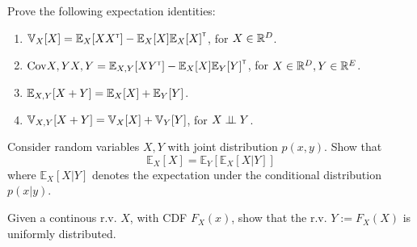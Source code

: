 \begin{question}
Prove the following expectation identities:
\begin{enumerate}[label=\alph*.]
\item $\Var{X}{X} = \Exp{X}{XX\transpose} - \Exp{X}{X}\Exp{X}{X}\transpose$, for $X \in \mathbb{R}^D$.
\item $\Cov{X,Y}{X,Y} = \Exp{X,Y}{XY\transpose} - \Exp{X}{X}\Exp{Y}{Y}\transpose$, for $X \in \mathbb{R}^D, Y\in\mathbb{R}^E$.
\item $\Exp{X,Y}{X + Y} = \Exp{X}{X} + \Exp{Y}{Y}$.
\item $\Var{X,Y}{X + Y} = \Var{X}{X} + \Var{Y}{Y}$, for $X \perp\!\!\!\perp Y$.
\end{enumerate}
\end{question}



\begin{question}
\label{q:mml-6.11}

Consider random variables $X,Y$ with joint distribution $p(x,y)$. Show that
\begin{equation}
\mathbb{E}_X[X]= \mathbb{E}_Y[\mathbb{E}_X [X|Y]]
\end{equation}
where $\mathbb{E}_X [X|Y]$ denotes the expectation under the conditional distribution $p(x|y)$.
\end{question}

\begin{question}
\label{q:mml-6.13}

Given a continous r.v. $X$, with CDF $F_X(x)$, show that the r.v. $Y:=F_X(X)$ is uniformly distributed.

\end{question}


%
%
